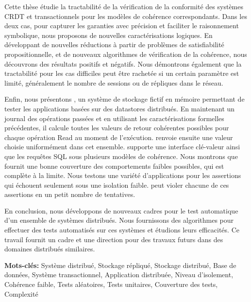 Cette thèse étudie la tractabilité de la vérification de la conformité des systèmes CRDT et transactionnels pour les modèles de cohérence correspondants. Dans les deux cas, pour capturer les garanties avec précision et faciliter le raisonnement symbolique, nous proposons de nouvelles caractérisations logiques. En développant de nouvelles réductions à partir de problèmes de satisfiabilité propositionnelle, et de nouveaux algorithmes de vérification de la cohérence, nous découvrons des résultats positifs et négatifs. Nous démontrons également que la tractabilité pour les cas difficiles peut être rachetée si un certain paramètre est limité, généralement le nombre de sessions ou de répliques dans le réseau.

Enfin, nous présentons \tool{}, un système de stockage fictif en mémoire permettant de tester les applications basées sur des datastores distribués. En maintenant un journal des opérations passées et en utilisant les caractérisations formelles précédentes, il calcule toutes les valeurs de retour cohérentes possibles pour chaque opération \textrm{Read} au moment de l'exécution. \tool{} renvoie ensuite une valeur choisie uniformément dans cet ensemble. \tool{} supporte une interface clé-valeur ainsi que les requêtes SQL sous plusieurs modèles de cohérence. Nous montrons que \tool{} fournit une bonne couverture des comportements faibles possibles, qui est complète à la limite. Nous testons une variété d'applications pour les assertions qui échouent seulement sous une isolation faible. \tool{} peut violer chacune de ces assertions en un petit nombre de tentatives.

En conclusion, nous développons de nouveaux cadres pour le test automatique d'un ensemble de systèmes distribués. Nous fournissons des algorithmes pour effectuer des tests automatisés sur ces systèmes et étudions leurs efficacités. Ce travail fournit un cadre et une direction pour des travaux futurs dans des domaines distribués similaires.

\textbf{Mots-clés:} Système distribué, Stockage répliqué, Stockage distribué, Base de données, Système transactionnel, Application distribuée, Niveau d'isolement, Cohérence faible, Tests aléatoires, Tests unitaires, Couverture des tests, Complexité
